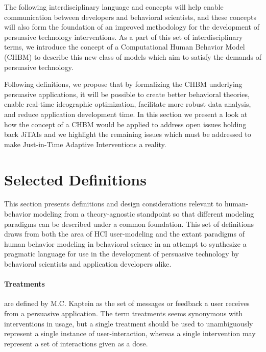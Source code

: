\documentclass[runningheads,a4paper]{llncs}
\begin{document}
The following interdisciplinary language and concepts will help enable communication between developers and behavioral scientists, and these concepts will also form the foundation of an improved methodology for the development of persuasive technology interventions.
As a part of this set of interdisciplinary terms, we introduce the concept of a Computational Human Behavior Model (CHBM) to describe this new class of models which aim to satisfy the demands of persuasive technology.

Following definitions, we propose that by formalizing the CHBM underlying persuasive applications, it will be possible to create better behavioral theories, enable real-time ideographic optimization, facilitate more robust data analysis, and reduce application development time. 
In this section we present a look at how the concept of a CHBM would be applied to address open issues holding back JiTAIs and we highlight the remaining issues which must be addressed to make Just-in-Time Adaptive Interventions a reality.

\section{Selected Definitions}

This section presents definitions and design considerations relevant to human-behavior modeling from a theory-agnostic standpoint so that different modeling paradigms can be described under a common foundation.
This set of definitions draws from both the area of HCI user-modeling and the extant paradigms of human behavior modeling in behavioral science in an attempt to synthesize a pragmatic language for use in the development of persuasive technology by behavioral scientists and application developers alike.

\paragraph{Treatments} are defined by M.C. Kaptein \cite{kaptein2015formalizing} as the set of messages or feedback a user receives from a persuasive application. 
The term treatments seems synonymous with interventions in usage, but a single treatment should be used to unambiguously represent a single instance of user-interaction, whereas a single intervention may represent a set of interactions given as a dose.
\end{document}
